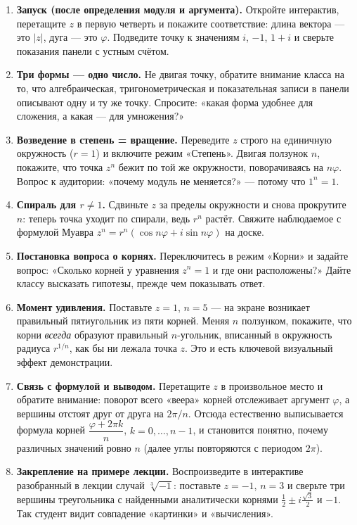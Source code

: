 \begin{enumerate}
  \item \textbf{Запуск (после определения модуля и аргумента).} Откройте
  интерактив, перетащите $z$ в первую четверть и покажите соответствие:
  длина вектора — это $|z|$, дуга — это $\varphi$. Подведите точку к
  значениям $i$, $-1$, $1+i$ и сверьте показания панели с устным счётом.

  \item \textbf{Три формы — одно число.} Не двигая точку, обратите
  внимание класса на то, что алгебраическая, тригонометрическая и
  показательная записи в панели описывают одну и ту же точку. Спросите:
  «какая форма удобнее для сложения, а какая — для умножения?»

  \item \textbf{Возведение в степень = вращение.} Переведите $z$ строго
  на единичную окружность ($r = 1$) и включите режим «Степень». Двигая
  ползунок $n$, покажите, что точка $z^n$ бежит по той же окружности,
  поворачиваясь на $n\varphi$. Вопрос к аудитории: «почему модуль не
  меняется?» — потому что $1^n = 1$.

  \item \textbf{Спираль для $r \neq 1$.} Сдвиньте $z$ за пределы
  окружности и снова прокрутите $n$: теперь точка уходит по спирали,
  ведь $r^n$ растёт. Свяжите наблюдаемое с формулой Муавра
  $z^n = r^n(\cos n\varphi + i\sin n\varphi)$ на доске.

  \item \textbf{Постановка вопроса о корнях.} Переключитесь в режим
  «Корни» и задайте вопрос: «Сколько корней у уравнения $z^n = 1$ и где
  они расположены?» Дайте классу высказать гипотезы, прежде чем
  показывать ответ.

  \item \textbf{Момент удивления.} Поставьте $z = 1$, $n = 5$ — на экране
  возникает правильный пятиугольник из пяти корней. Меняя $n$ ползунком,
  покажите, что корни \emph{всегда} образуют правильный $n$-угольник,
  вписанный в окружность радиуса $r^{1/n}$, как бы ни лежала точка $z$.
  Это и есть ключевой визуальный эффект демонстрации.

  \item \textbf{Связь с формулой и выводом.} Перетащите $z$ в
  произвольное место и обратите внимание: поворот всего «веера» корней
  отслеживает аргумент $\varphi$, а вершины отстоят друг от друга на
  $2\pi/n$. Отсюда естественно выписывается формула корней
  $\dfrac{\varphi + 2\pi k}{n}$, $k = 0, \dots, n-1$, и становится
  понятно, почему различных значений ровно $n$ (далее углы повторяются с
  периодом $2\pi$).

  \item \textbf{Закрепление на примере лекции.} Воспроизведите в
  интерактиве разобранный в лекции случай $\sqrt[3]{-1}$: поставьте
  $z = -1$, $n = 3$ и сверьте три вершины треугольника с найденными
  аналитически корнями $\tfrac12 \pm i\tfrac{\sqrt3}{2}$ и $-1$. Так
  студент видит совпадение «картинки» и «вычисления».
\end{enumerate}
